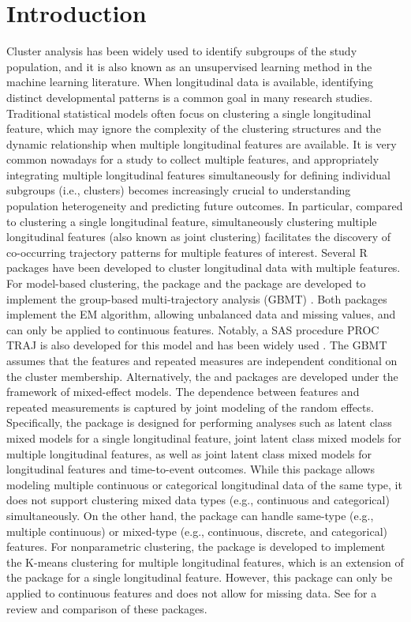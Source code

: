 \section[Introduction]{Introduction} \label{sec:intro}
Cluster analysis has been widely used to identify subgroups of the study population, and it is also known as an unsupervised learning method in the machine learning literature. When longitudinal data is available, identifying distinct developmental patterns is a common goal in many research studies. Traditional statistical models often focus on clustering a single longitudinal feature, which may ignore the complexity of the clustering structures and the dynamic relationship when multiple longitudinal features are available. It is very common nowadays for a study to collect multiple features, and appropriately integrating multiple longitudinal features simultaneously for defining individual subgroups (i.e., clusters) becomes increasingly crucial to understanding population heterogeneity and predicting future outcomes. In particular, compared to clustering a single longitudinal feature, simultaneously clustering multiple longitudinal features (also known as joint clustering) facilitates the discovery of co-occurring trajectory patterns for multiple features of interest.
Several R packages have been developed to cluster longitudinal data with multiple features. For model-based clustering, the  package \citep{Magrini2022} and the  package \citep{Leisch2004} are developed to implement the group-based multi-trajectory analysis (GBMT) \citep{Nagin2018, Magrini2022a}. Both packages implement the EM algorithm, allowing unbalanced data and missing values, and can only be applied to continuous features. Notably, a SAS procedure PROC TRAJ is also developed for this model and has been widely used \citep{Nagin2018}. The GBMT assumes that the features and repeated measures are independent conditional on the cluster membership. Alternatively, the  and  packages are developed under the framework of mixed-effect models. The dependence between features and repeated measurements is captured by joint modeling of the random effects. Specifically, the  package is designed for performing analyses such as latent class mixed models for a single longitudinal feature, joint latent class mixed models for multiple longitudinal features, as well as joint latent class mixed models for longitudinal features and time-to-event outcomes. While this package allows modeling multiple continuous or categorical longitudinal data of the same type, it does not support clustering mixed data types (e.g., continuous and categorical) simultaneously. On the other hand, the  package can handle same-type (e.g., multiple continuous) or mixed-type (e.g., continuous, discrete, and categorical) features. For nonparametric clustering, the  package \citep{Genolini2013} is developed to implement the K-means clustering for multiple longitudinal features, which is an extension of the  package \citep{Genolini2010} for a single longitudinal feature. However, this package can only be applied to continuous features and does not allow for missing data. See \citet{Lu2023} for a review and comparison of these packages.
